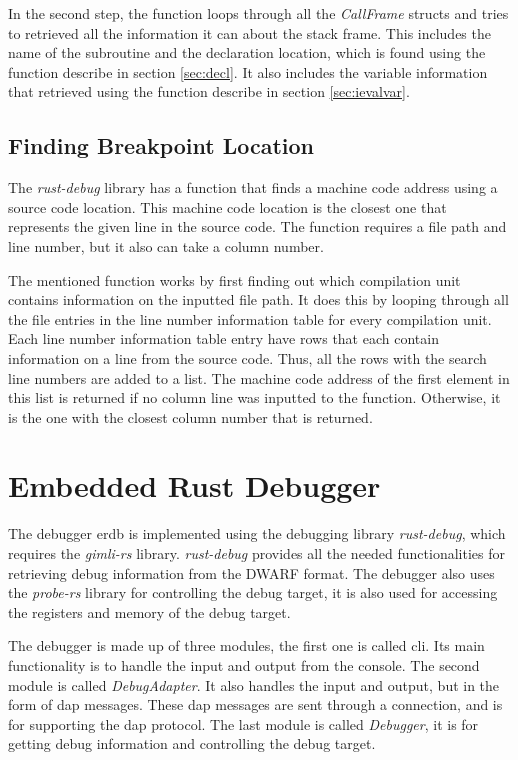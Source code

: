 In the second step, the function loops through all the \emph{CallFrame} structs and tries to retrieved all the information it can about the stack frame.
This includes the name of the subroutine and the declaration location, which is found using the function describe in section \ref{sec:decl}.
It also includes the variable information that retrieved using the function describe in section \ref{sec:ievalvar}.



\subsection{Finding Breakpoint Location}
The \emph{rust-debug} library has a function that finds a machine code address using a source code location.
This machine code location is the closest one that represents the given line in the source code.
The function requires a file path and line number, but it also can take a column number.


The mentioned function works by first finding out which compilation unit contains information on the inputted file path.
It does this by looping through all the file entries in the line number information table for every compilation unit.
Each line number information table entry have rows that each contain information on a line from the source code.
Thus, all the rows with the search line numbers are added to a list.
The machine code address of the first element in this list is returned if no column line was inputted to the function.
Otherwise, it is the one with the closest column number that is returned.




\section{Embedded Rust Debugger}
The debugger \acrfull{erdb} is implemented using the debugging library \emph{rust-debug}, which requires the \emph{gimli-rs} library.
\emph{rust-debug} provides all the needed functionalities for retrieving debug information from the \gls{DWARF} format.
The debugger also uses the \emph{probe-rs} library for controlling the debug target, it is also used for accessing the registers and memory of the debug target.


The debugger is made up of three modules, the first one is called \acrshort{cli}.
Its main functionality is to handle the input and output from the console.
The second module is called \emph{DebugAdapter}.
It also handles the input and output, but in the form of \gls{dap} messages.
These \gls{dap} messages are sent through a  connection, and is for supporting the \gls{dap} protocol.
The last module is called \emph{Debugger}, it is for getting debug information and controlling the debug target.




